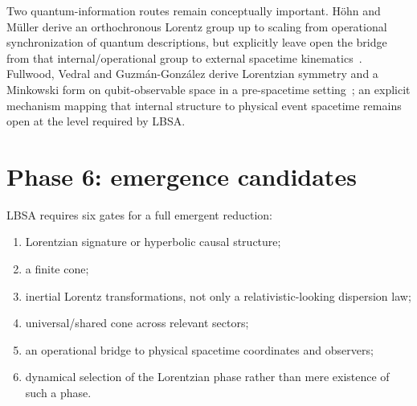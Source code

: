 \documentclass[11pt,a4paper]{article}
\begin{document}
Two quantum-information routes remain conceptually important.  H\"ohn and M\"uller derive an orthochronous Lorentz group up to scaling from operational synchronization of quantum descriptions, but explicitly leave open the bridge from that internal/operational group to external spacetime kinematics~\cite{hohn2016}.  Fullwood, Vedral and Guzm\'an-Gonz\'alez derive Lorentzian symmetry and a Minkowski form on qubit-observable space in a pre-spacetime setting~\cite{fullwood2026}; an explicit mechanism mapping that internal structure to physical event spacetime remains open at the level required by LBSA.

\section{Phase 6: emergence candidates}
LBSA requires six gates for a full emergent reduction:
\begin{enumerate}
\item Lorentzian signature or hyperbolic causal structure;
\item a finite cone;
\item inertial Lorentz transformations, not only a relativistic-looking dispersion law;
\item universal/shared cone across relevant sectors;
\item an operational bridge to physical spacetime coordinates and observers;
\item dynamical selection of the Lorentzian phase rather than mere existence of such a phase.
\end{enumerate}
\end{document}
